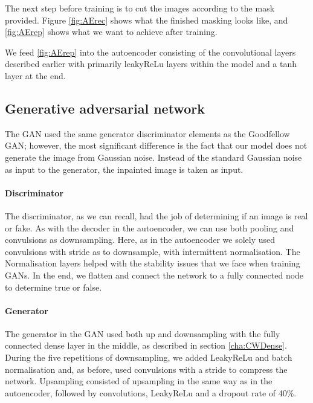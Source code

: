 The next step before training is to cut the images according to the mask provided. Figure \ref{fig:AErec} shows what the finished masking looks like, and \ref{fig:AErep} shows what we want to achieve after training.

We feed \ref{fig:AErep} into the autoencoder consisting of the convolutional layers described earlier with primarily leakyReLu layers within the model and a tanh layer at the end.



\subsection{Generative adversarial network}
The GAN used the same generator discriminator elements as the Goodfellow GAN; however, the most significant difference is the fact that our model does not generate the image from Gaussian noise.
Instead of the standard Gaussian noise as input to the generator, the inpainted image is taken as input. 

\paragraph{Discriminator}
The discriminator, as we can recall, had the job of determining if an image is real or fake. As with the decoder in the autoencoder, we can use both pooling and convulsions as downsampling. Here, as in the autoencoder we solely used convulsions with stride as to downsample, with intermittent normalisation. The Normalisation layers helped with the stability issues that we face when training GANs. In the end, we flatten and connect the network to a fully connected node to determine true or false.

\paragraph{Generator}
The generator in the GAN used both up and downsampling with the fully connected dense layer in the middle, as described in section \ref{cha:CWDense}.  
During the five repetitions of downsampling, we added LeakyReLu and batch normalisation and, as before, used convulsions with a stride to compress the network.
Upsampling consisted of upsampling in the same way as in the autoencoder, followed by convolutions, LeakyReLu and a dropout rate of 40\%. 




